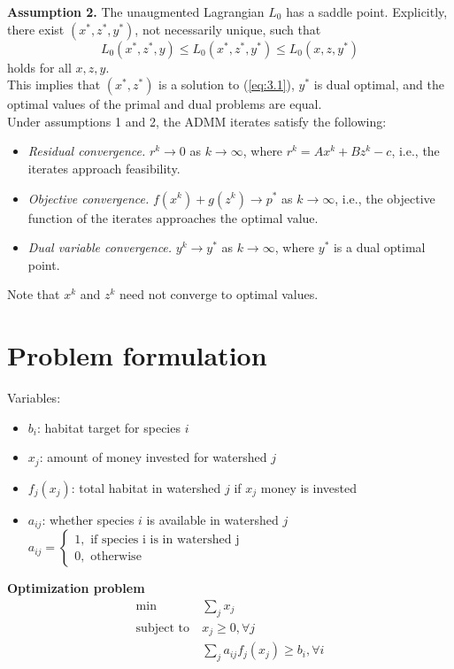 \documentclass{article}
\begin{document}
\textbf{Assumption 2.} The unaugmented Lagrangian $L_0$ has a saddle point. Explicitly, there exist $(x^*, z^*, y^*)$, not necessarily unique, such that
$$L_0(x^*, z^*, y) \le L_0(x^*, z^*, y^*) \le L_0(x,z,y^*)$$ holds for all $x,z,y$.\\
This implies that $(x^*, z^*)$ is a solution to (\ref{eq:3.1}), $y^*$ is dual optimal, and the optimal values of the primal and dual problems are equal. \\

Under assumptions 1 and 2, the ADMM iterates satisfy the following:
\begin{itemize}
    \item \textit{Residual convergence.} $r^k \rightarrow 0$ as $k \rightarrow \infty$, where $r^k = Ax^k + Bz^k - c$, i.e., the iterates approach feasibility. \item \textit{Objective convergence.} $f(x^k) + g(z^k) \rightarrow p^*$ as $k \rightarrow \infty$, i.e., the objective function of the iterates approaches the optimal value. 
    \item \textit{Dual variable convergence.} $y^k \rightarrow y^*$ as $k \rightarrow \infty$, where $y^*$ is a dual optimal point.
\end{itemize}
Note that $x^k$ and $z^k$ need not converge to optimal values.

\section{Problem formulation}
Variables:
\begin{itemize}
    \item $b_i$: habitat target for species $i$
    \item $x_j$: amount of money invested for watershed $j$
    \item $f_j(x_j)$: total habitat in watershed $j$ if $x_j$ money is invested
    \item $a_{ij}$: whether species $i$ is available in watershed $j$\\
    $a_{ij} = 
    \begin{cases}
    1, \text{ if species i is in watershed j}\\
    0, \text{ otherwise}
    \end{cases}$
\end{itemize}
\textbf{Optimization problem}
\begin{align*}
    \min\ &\sum\limits_j x_j\\
    \text{subject to} \ & x_j \ge 0, \forall j \\
    &\sum\limits_j a_{ij}f_j(x_j)\ge b_i, \forall i
\end{align*}
\end{document}
